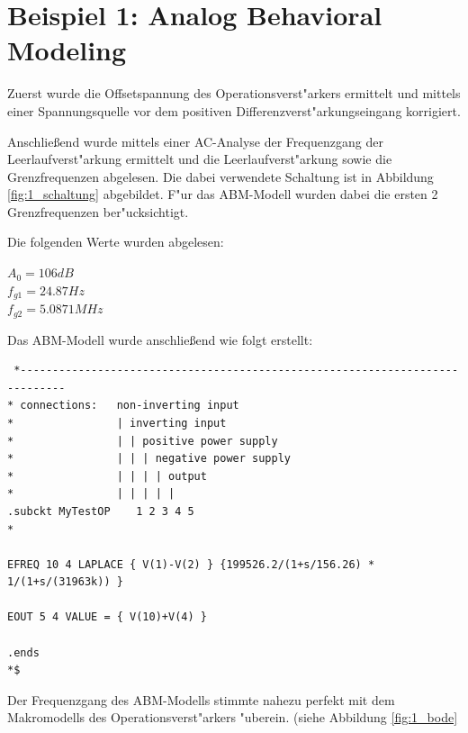 \section{Beispiel 1: Analog Behavioral Modeling}

Zuerst wurde die Offsetspannung des Operationsverst"arkers ermittelt und mittels einer
Spannungsquelle vor dem positiven Differenzverst"arkungseingang korrigiert.

Anschlie\ss{}end wurde mittels einer AC-Analyse der Frequenzgang der Leerlaufverst"arkung ermittelt
und die Leerlaufverst"arkung sowie die Grenzfrequenzen abgelesen. Die dabei verwendete Schaltung
 ist in Abbildung \ref{fig:1_schaltung} abgebildet.
F"ur das ABM-Modell wurden dabei die ersten 2 Grenzfrequenzen ber"ucksichtigt.


Die folgenden Werte wurden abgelesen:

$A_0 = 106 dB$ \\
$f_{g1} = 24.87 Hz$ \\
$f_{g2} = 5.0871 MHz$



Das ABM-Modell wurde anschlie\ss{}end wie folgt erstellt:

\begin{verbatim}
 *-----------------------------------------------------------------------------
* connections:   non-inverting input
*                | inverting input
*                | | positive power supply
*                | | | negative power supply
*                | | | | output
*                | | | | |
.subckt MyTestOP    1 2 3 4 5
*

EFREQ 10 4 LAPLACE { V(1)-V(2) } {199526.2/(1+s/156.26) * 1/(1+s/(31963k)) }

EOUT 5 4 VALUE = { V(10)+V(4) }

.ends
*$
\end{verbatim}

Der Frequenzgang des ABM-Modells stimmte nahezu perfekt mit dem Makromodells des Operationsverst"arkers "uberein.
(siehe Abbildung \ref{fig:1_bode}

